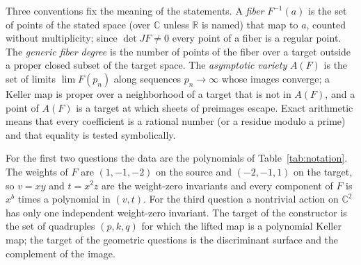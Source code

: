 \documentclass[11pt]{article}
\theoremstyle{definition}
\theoremstyle{remark}
\newcommand{\C}{\mathbb{C}}
\newcommand{\R}{\mathbb{R}}
\newcommand{\detJ}{\det JF}
\begin{document}
Three conventions fix the meaning of the statements. A \emph{fiber} $F^{-1}(a)$ is the set of points of the stated space (over $\C$ unless $\R$ is named) that map to $a$, counted without multiplicity; since $\detJ \neq 0$ every point of a fiber is a regular point. The \emph{generic fiber degree} is the number of points of the fiber over a target outside a proper closed subset of the target space. The \emph{asymptotic variety} $A(F)$ is the set of limits $\lim F(p_n)$ along sequences $p_n \to \infty$ whose images converge; a Keller map is proper over a neighborhood of a target that is not in $A(F)$, and a point of $A(F)$ is a target at which sheets of preimages escape. Exact arithmetic means that every coefficient is a rational number (or a residue modulo a prime) and that equality is tested symbolically.

For the first two questions the data are the polynomials of Table~\ref{tab:notation}. The weights of $F$ are
$(1,-1,-2)$ on the source and $(-2,-1,1)$ on the target, so $v = xy$ and $t = x^2 z$ are the weight-zero invariants
and every component of $F$ is $x^{b}$ times a polynomial in $(v, t)$. For the third question a nontrivial action on $\C^2$ has only one
independent weight-zero invariant. The target of the constructor is the set of
quadruples $(p, k, q)$ for which the lifted map is a polynomial Keller map; the target of the geometric questions is the discriminant surface
and the complement of the image.
\end{document}

